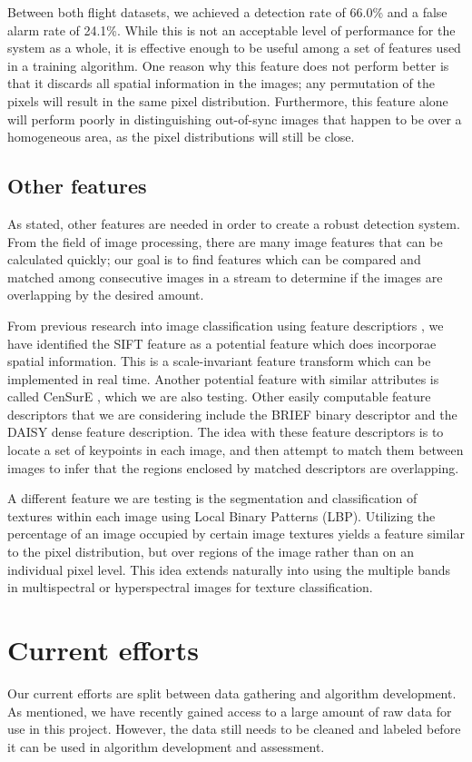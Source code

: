 Between both flight datasets, we achieved a detection rate of 66.0\% and a false alarm rate of 24.1\%.
While this is not an acceptable level of performance for the system as a whole, it is effective enough to be useful among a set of features used in a training algorithm.
One reason why this feature does not perform better is that it discards all spatial information in the images; any permutation of the pixels will result in the same pixel distribution.
Furthermore, this feature alone will perform poorly in distinguishing out-of-sync images that happen to be over a homogeneous area, as the pixel distributions will still be close.

\subsection {Other features}
As stated, other features are needed in order to create a robust detection system.
From the field of image processing, there are many image features that can be calculated quickly; our goal is to find features which can be compared and matched among consecutive images in a stream to determine if the images are overlapping by the desired amount.

From previous research into image classification using feature descriptiors \cite{hyperspectralClass}, we have identified the SIFT feature as a potential feature which does incorporae spatial information.
This is a scale-invariant feature transform which can be implemented in real time.
Another potential feature with similar attributes is called CenSurE \cite{censure} , which we are also testing.
Other easily computable feature descriptors that we are considering include the BRIEF binary descriptor and the DAISY dense feature description.
The idea with these feature descriptors is to locate a set of keypoints in each image, and then attempt to match them between images to infer that the regions enclosed by matched descriptors are overlapping.

A different feature we are testing is the segmentation and classification of textures within each image using Local Binary Patterns (LBP).
Utilizing the percentage of an image occupied by certain image textures yields a feature similar to the pixel distribution, but over regions of the image rather than on an individual pixel level.
This idea extends naturally into using the multiple bands in multispectral or hyperspectral images for texture classification.


\section {Current efforts}
Our current efforts are split between data gathering and algorithm development.
As mentioned, we have recently gained access to a large amount of raw data for use in this project.
However, the data still needs to be cleaned and labeled before it can be used in algorithm development and assessment.

